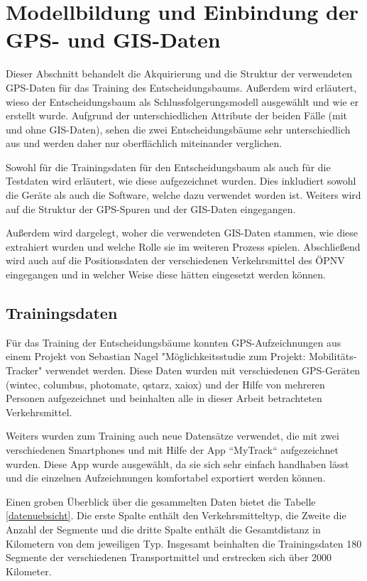\chapter{Modellbildung und Einbindung der \\GPS- und GIS-Daten}
Dieser Abschnitt behandelt die Akquirierung und die Struktur der verwendeten GPS-Daten für das Training des Entscheidungsbaums. Außerdem wird erläutert, wieso der Entscheidungsbaum als Schlussfolgerungsmodell ausgewählt und wie er erstellt wurde. Aufgrund der unterschiedlichen Attribute  der beiden Fälle (mit und ohne GIS-Daten), sehen die zwei Entscheidungsbäume sehr unterschiedlich aus und werden daher nur oberflächlich miteinander verglichen.

Sowohl für die Trainingsdaten für den Entscheidungsbaum als auch für die Testdaten wird erläutert, wie diese aufgezeichnet wurden. Dies inkludiert sowohl die Geräte als auch die Software, welche dazu verwendet worden ist. Weiters wird auf die Struktur der GPS-Spuren und der GIS-Daten eingegangen.

Außerdem wird dargelegt, woher die verwendeten GIS-Daten stammen, wie diese extrahiert wurden und welche Rolle sie im weiteren Prozess spielen. Abschließend wird auch auf die Positionsdaten der verschiedenen Verkehrsmittel des ÖPNV eingegangen und in welcher Weise diese hätten eingesetzt werden können.
\clearpage

\section{Trainingsdaten}
\label{sec:trainingdata}
Für das Training der Entscheidungsbäume konnten GPS-Aufzeichnungen aus einem Projekt von Sebastian Nagel "Möglichkeitsstudie zum Projekt: Mobilitäts-Tracker" verwendet werden. Diese Daten wurden mit verschiedenen GPS-Geräten (wintec, columbus, photomate, qstarz, xaiox) und der Hilfe von mehreren Personen aufgezeichnet und beinhalten alle in dieser Arbeit betrachteten Verkehrsmittel. \cite{sebastian_nagel_moglichkeitsstudie_2011}

Weiters wurden zum Training auch neue Datensätze verwendet, die mit zwei verschiedenen Smartphones und mit Hilfe der App ``MyTrack`` aufgezeichnet wurden. Diese App wurde ausgewählt, da sie sich sehr einfach handhaben lässt und die einzelnen Aufzeichnungen komfortabel exportiert werden können. 

Einen groben Überblick über die gesammelten Daten bietet die Tabelle \ref{datenuebsicht}. Die erste Spalte enthält den Verkehrsmitteltyp, die Zweite die Anzahl der Segmente  und die dritte Spalte enthält die Gesamtdistanz in Kilometern von dem jeweiligen Typ. Insgesamt beinhalten die Trainingsdaten 180 Segmente der verschiedenen Transportmittel und erstrecken sich über 2000 Kilometer.

